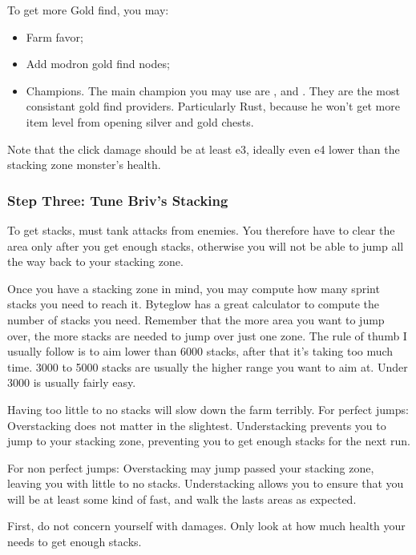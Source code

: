 \documentclass{article}
\begin{document}
To get more Gold find, you may:
\begin{itemize}
    \item Farm favor;
    \item Add modron gold find nodes;
    \item Champions.
    The main champion you may use are \rust, \jarlaxle and \azaka.
    They are the most consistant gold find providers.
    Particularly Rust, because he won't get more item level from opening silver and gold chests.
\end{itemize}

Note that the click damage should be at least e3, ideally even e4 lower than the stacking zone monster's health.

\subsubsection{Step Three: Tune Briv's Stacking}
\label{sec:stepThree}

To get stacks, \briv must tank attacks from enemies.
You therefore have to clear the area only after you get enough stacks, otherwise you will not be able to jump all the way back to your stacking zone.


Once you have a stacking zone in mind, you may compute how many sprint stacks you need to reach it.
Byteglow has a great calculator to compute the number of stacks you need.
Remember that the more area you want to jump over, the more stacks are needed to jump over just one zone.
The rule of thumb I usually follow is to aim lower than 6000 stacks, after that it's taking too much time.
3000 to 5000 stacks are usually the higher range you want to aim at.
Under 3000 is usually fairly easy.


Having too little to no stacks will slow down the farm terribly.
For perfect jumps:
    Overstacking does not matter in the slightest.
    Understacking prevents you to jump to your stacking zone, preventing you to get enough stacks for the next run.

For non perfect jumps:
    Overstacking may jump passed your stacking zone, leaving you with little to no stacks.
    Understacking allows you to ensure that you will be at least some kind of fast, and walk the lasts areas as expected.

First, do not concern yourself with damages.
Only look at how much health your \briv needs to get enough stacks.
\end{document}
